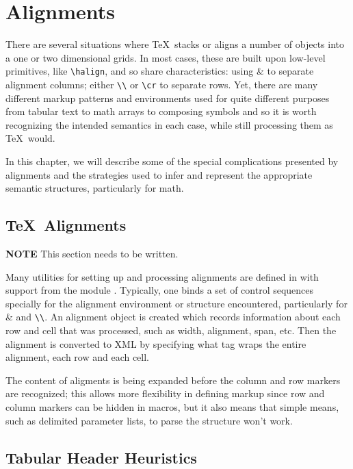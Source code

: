 \documentclass{book}
\begin{document}
\chapter{Alignments}\label{alignments}
There are several situations where \TeX\ stacks or aligns a number of objects into
a one or two dimensional grids.  In most cases, these are built upon
low-level primitives, like \verb|\halign|, and so share characteristics:
using \&  to separate alignment columns;
either \verb|\\| or \verb|\cr| to separate rows.
Yet, there are many different markup patterns and environments
used for quite different purposes from tabular text to math arrays
to composing symbols and so it is worth recognizing the intended semantics in each case,
while still processing them as \TeX\ would.

In this chapter, we will describe some of the special complications
presented by alignments and the strategies used to infer and
represent the appropriate semantic structures, particularly for math.

\section{\TeX\ Alignments}\label{alignments.tex}
\textbf{NOTE} This section needs to be written.

Many utilities for setting up and processing alignments are defined in 
with support from the module .
Typically, one binds a set of control sequences specially for the
alignment environment or structure encountered, particularly for
\& and \verb|\\|. An alignment object is created which records information
about each row and cell that was processed, such as width, alignment, span, etc.
Then the alignment is converted to XML by specifying what tag wraps the
entire alignment, each row and each cell.

The content of aligments is being expanded before the column and row
markers are recognized; this allows more flexibility in defining markup
since row and column markers can be hidden in macros, but it also
means that simple means, such as delimited parameter lists, to parse
the structure won't work.

\section{Tabular Header Heuristics}\label{alignments.tabular}
\end{document}
